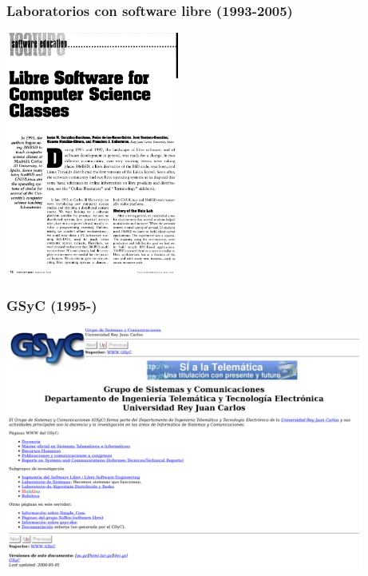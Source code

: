 \begin{frame}[fragile]
  \frametitle{Laboratorios con software libre (1993-2005)}

  \begin{center}
  \includegraphics[height=8cm]{figs/libre-classes}
  \end{center}  
  
\end{frame}

\begin{frame}[fragile]
  \frametitle{GSyC (1995-)}

  \begin{center}
  \includegraphics[height=8cm]{figs/gsyc}
  \end{center}  
  
\end{frame}


